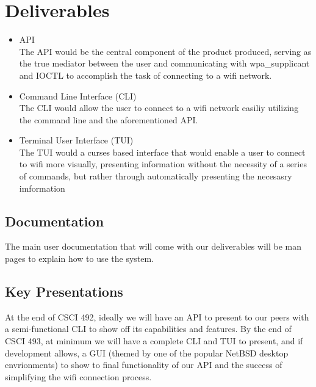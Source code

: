 \section{Deliverables}
\begin{itemize}
	\item API\\
				The API would be the central component of the product produced, serving as the true mediator between the user and communicating with wpa\_supplicant and IOCTL to accomplish the task of connecting to a wifi network. 
	\item Command Line Interface (CLI)\\
				The CLI would allow the user to connect to a wifi network easiliy utilizing the command line and the aforementioned API.
	\item Terminal User Interface (TUI)\\
				The TUI would a curses based interface that would enable a user to connect to wifi more visually, presenting information without the necessity of a series of commands, but rather through automatically presenting the necesasry imformation
\end{itemize}

\subsection{Documentation}

The main user documentation that will come with our deliverables will be man pages to explain how to use the system.

\subsection{Key Presentations}

At the end of CSCI 492, ideally we will have an API to present to our peers with a semi-functional CLI to show off its capabilities and features.
By the end of CSCI 493, at minimum we will have a complete CLI and TUI to present, and if development allows, a GUI (themed by one of the popular NetBSD desktop envrionments) to show to final functionality of our API and the success of simplifying the wifi connection process.
